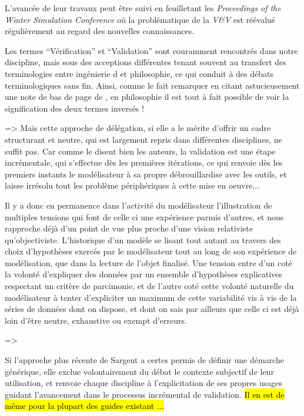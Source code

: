 L'avancée de leur travaux peut être suivi en feuilletant les \textit{Proceedings of the Winter Simulation Conference} où la problématique de la \textit{V\&V} est réévalué régulièrement au regard des nouvelles connaissances. 

Les termes \enquote{Vérification} et  \enquote{Validation} sont couramment rencontrés dans notre discipline, mais sous des acceptions différentes tenant souvent au transfert des terminologies entre ingénierie \autocite{Sargent1984} d\autocite{Balci1998} et philosophie, ce qui conduit à  des débats terminologiques sans fin. Ainsi, comme le fait remarquer \textcite{Kleijnen1995} en citant astucieusement une note de bas de page de \textcite{Barlas1990}, en philosophie il est tout à fait possible de voir la signification des deux termes inversés !


=> Mais cette approche de délégation, si elle a le mérite d'offrir un cadre structurant et neutre, qui est largement repris dans différentes disciplines, ne suffit pas. Car comme le disent bien les auteurs, la validation est une étape incrémentale, qui s'effectue dès les premières itérations, ce qui renvoie dès les premiers instants le modélisateur à sa propre débrouillardise avec les outils, et laisse irrésolu tout les problème périphériques à cette mise en oeuvre...


Il y a donc en permanence dans l'activité du modélisateur l'illustration de multiples tensions qui font de celle ci une expérience parmis d'autres, et nous rapproche déjà d'un point de vue plus proche d'une vision relativiste qu'objectiviste. L'historique d'un modèle se lisant tout autant au travers des choix d'hypothèses exercés par le modélisateur tout au long de son expérience de modélisation, que dans la lecture de l'objet finalisé. Une tension entre d'un coté la volonté d'expliquer des données par un ensemble d'hypothèses explicatives respectant un critère de parcimonie, et de l'autre coté cette volonté naturelle du modélisateur à tenter d'expliciter un maximum de cette variabilité vis à vis de la séries de données dont on dispose, et dont on sais par ailleurs que celle ci est déjà loin d'être neutre, exhaustive ou exempt d'erreurs.

=> 

Si l'approche plus récente de Sargent a certes permis de définir une démarche générique, elle exclue volontairement du débat le contexte subjectif de leur utilisation, et renvoie chaque discipline à l'explicitation de ses propres usages guidant l'avancement dans le processus incrémental de validation. \hl{Il en est de même pour la plupart des guides existant ...}

